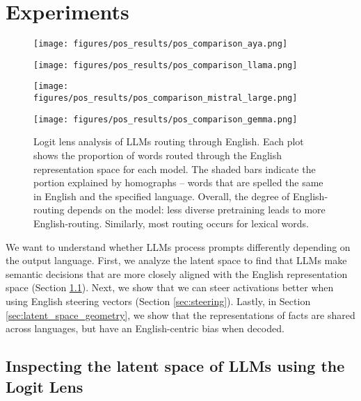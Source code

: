 \section{Experiments}

\begin{figure*}[t]
\begin{minipage}{0.49\textwidth}
    \centering
    \subcaption{\aya}
    \texttt{[image: figures/pos\_results/pos\_comparison\_aya.png]} 
     
    \end{minipage}
    \begin{minipage}{0.49\textwidth}
    \centering
     \subcaption{\llama}
    \texttt{[image: figures/pos\_results/pos\_comparison\_llama.png]} 
    \end{minipage}
    \begin{minipage}{0.49\textwidth}
    \centering
    \subcaption{\mistral}
    \texttt{[image: figures/pos\_results/pos\_comparison\_mistral\_large.png]}      
    \end{minipage}
    \begin{minipage}{0.49\textwidth}
    \centering
    \subcaption{\gemma}
    \texttt{[image: figures/pos\_results/pos\_comparison\_gemma.png]} 
    \end{minipage}
    \caption{Logit lens analysis of LLMs routing through English. Each plot shows the proportion of words routed through the English representation space for each model. The shaded bars indicate the portion explained by homographs -- words that are spelled the same in English and the specified language. Overall, the degree of English-routing depends on the model: less diverse pretraining leads to more English-routing. Similarly, most routing occurs for lexical words.}
    \label{fig:pos_plots}
\end{figure*}

We want to understand whether LLMs process prompts differently depending on the output language. 
First, we analyze the latent space to find that LLMs make semantic decisions that are more closely aligned with the English representation space (Section \ref{sec:logit_lens_latent}).
Next, we show that we can steer activations better when using English steering vectors (Section \ref{sec:steering}). Lastly, in Section \ref{sec:latent_space_geometry}, we show that the representations of facts are shared across languages, but have an English-centric bias when decoded. 


\subsection{Inspecting the latent space of LLMs using the Logit Lens} \label{sec:logit_lens_latent}


